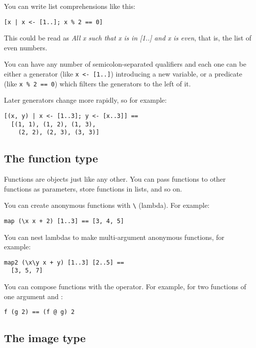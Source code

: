 You can write list comprehensions like this:

\begin{verbatim}
[x | x <- [1..]; x % 2 == 0]
\end{verbatim}

\noindent
This could be read as \emph{All x such that x is in [1..] and x is
even}, that is, the list of even numbers.

You can have any number of semicolon-separated qualifiers and each one can be
either a generator (like \verb"x <- [1..]") introducing a new variable,
or a predicate (like \verb"x % 2 == 0") which filters the generators to the
left of it. 

Later generators change more rapidly, so for example:

\begin{verbatim}
[(x, y) | x <- [1..3]; y <- [x..3]] ==
  [(1, 1), (1, 2), (1, 3), 
    (2, 2), (2, 3), (3, 3)]
\end{verbatim}

\subsection{The function type}

Functions are objects just like any other. You can pass functions to other
functions as parameters, store functions in lists, and so on. 

You can create anonymous functions with \verb"\" (lambda). For example:

\begin{verbatim}
map (\x x + 2) [1..3] == [3, 4, 5]
\end{verbatim}

You can nest lambdas to make multi-argument anonymous functions, for example:

\begin{verbatim}
map2 (\x\y x + y) [1..3] [2..5] == 
  [3, 5, 7]
\end{verbatim}

You can compose functions with the  operator. For example, for two
functions of one argument  and :

\begin{verbatim}
f (g 2) == (f @ g) 2
\end{verbatim}

\subsection{The image type}

